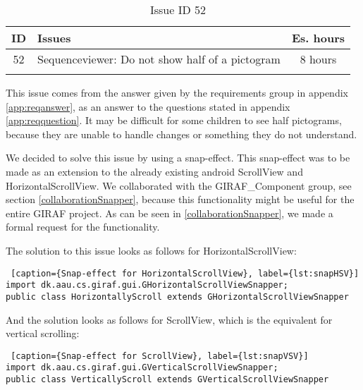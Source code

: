 \begin{longtable} { | c | p{12cm} | c | } 
\hline
	ID 	&	Issues	&		 Es. hours \\\hline
	52 	&	Sequenceviewer: Do not show half of a pictogram	&	8 hours \\\hline
\caption{Issue ID 52}
\label{tab:spr3_SVnohalfpictograms}
\end{longtable}

This issue comes from the answer given by the requirements group in appendix \ref{app:reqanswer}, as an answer to the questions stated in appendix \ref{app:reqquestion}. It may be difficult for some children to see half pictograms, because they are unable to handle changes or something they do not understand. 

We decided to solve this issue by using a snap-effect. This snap-effect was to be made as an extension to the already existing android ScrollView and HorizontalScrollView. We collaborated with the GIRAF\_Component group, see section \ref{collaborationSnapper}, because this functionality might be useful for the entire GIRAF project. As can be seen in \ref{collaborationSnapper}, we made a formal request for the functionality.

The solution to this issue looks as follows for HorizontalScrollView:
\begin{lstlisting} [caption={Snap-effect for HorizontalScrollView}, label={lst:snapHSV}]
import dk.aau.cs.giraf.gui.GHorizontalScrollViewSnapper;
public class HorizontallyScroll extends GHorizontalScrollViewSnapper
\end{lstlisting}

And the solution looks as follows for ScrollView, which is the equivalent for vertical scrolling:
\begin{lstlisting} [caption={Snap-effect for ScrollView}, label={lst:snapVSV}]
import dk.aau.cs.giraf.gui.GVerticalScrollViewSnapper;
public class VerticallyScroll extends GVerticalScrollViewSnapper
\end{lstlisting}